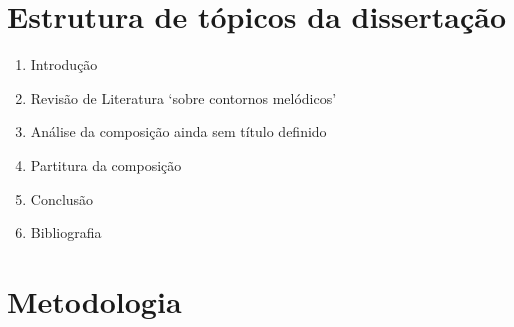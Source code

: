\documentclass{article}
\begin{document}
\section{Estrutura de tópicos da dissertação}
\label{sec:estrutura-de-topicos}

\begin{enumerate}
\item Introdução
\item Revisão de Literatura `sobre contornos melódicos'
\item Análise da composição ainda sem título definido
\item Partitura da composição
\item Conclusão
\item Bibliografia
\end{enumerate}

\section{Metodologia}
\label{sec:metodologia}
\end{document}
